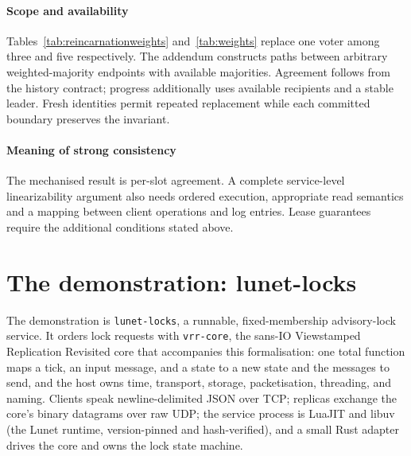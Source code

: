 \documentclass[10pt,journal,letterpaper]{IEEEtran}
\newcommand{\code}[1]{\texttt{#1}}
\begin{document}
\paragraph{Scope and availability}
Tables~\ref{tab:reincarnationweights} and~\ref{tab:weights} replace one voter among three and five respectively. The addendum constructs paths between arbitrary weighted-majority endpoints with available majorities. Agreement follows from the history contract; progress additionally uses available recipients and a stable leader. Fresh identities permit repeated replacement while each committed boundary preserves the invariant.

\paragraph{Meaning of strong consistency}
The mechanised result is per-slot agreement. A complete service-level linearizability argument also needs ordered execution, appropriate read semantics and a mapping between client operations and log entries. Lease guarantees require the additional conditions stated above.

\section{The demonstration: lunet-locks}\label{sec:demo}
The demonstration is \code{lunet-locks}, a runnable, fixed-membership
advisory-lock service. It orders lock requests with \code{vrr-core}, the
sans-IO Viewstamped Replication Revisited core that accompanies this
formalisation: one total function maps a tick, an input message, and a state
to a new state and the messages to send, and the host owns time, transport,
storage, packetisation, threading, and naming. Clients speak
newline-delimited JSON over TCP; replicas exchange the core's binary
datagrams over raw UDP; the service process is LuaJIT and libuv (the Lunet
runtime, version-pinned and hash-verified), and a small Rust adapter drives
the core and owns the lock state machine.
\end{document}
